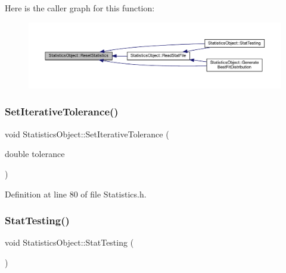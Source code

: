 Here is the caller graph for this function\+:
\nopagebreak
\begin{figure}[H]
\begin{center}
\leavevmode
\includegraphics[width=350pt]{class_statistics_object_aafceb8d5caaffc3482e5f9be760fc953_icgraph}
\end{center}
\end{figure}
\mbox{\label{class_statistics_object_ae820e4df3a29f2627a4ba5c3ac0b7862}} 
\subsubsection{\texorpdfstring{Set\+Iterative\+Tolerance()}{SetIterativeTolerance()}}
{\footnotesize\ttfamily void Statistics\+Object\+::\+Set\+Iterative\+Tolerance (\begin{DoxyParamCaption}\item[{double}]{tolerance }\end{DoxyParamCaption})\hspace{0.3cm}{\ttfamily [inline]}}



Definition at line 80 of file Statistics.\+h.

\mbox{\label{class_statistics_object_a9545eace92c4a478cf20dba20f8e51bf}} 
\subsubsection{\texorpdfstring{Stat\+Testing()}{StatTesting()}}
{\footnotesize\ttfamily void Statistics\+Object\+::\+Stat\+Testing (\begin{DoxyParamCaption}{ }\end{DoxyParamCaption})}



